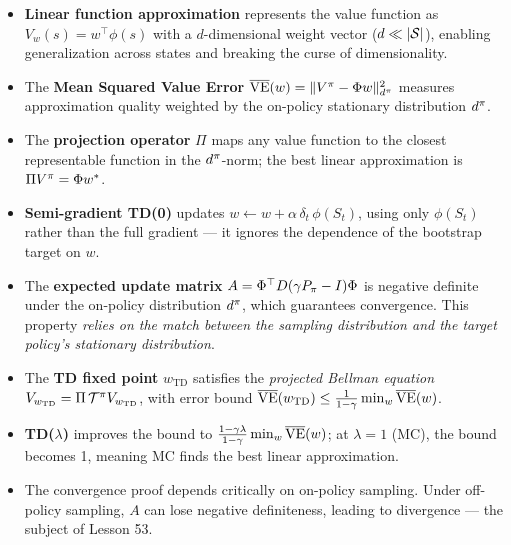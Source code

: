 \documentclass[11pt,a4paper]{article}
\begin{document}
\begin{itemize}
  \item \textbf{Linear function approximation} represents the value
    function as $V_w(s) = w^\top \phi(s)$ with a $d$-dimensional
    weight vector ($d \ll |\mathcal{S}|$), enabling generalization across
    states and breaking the curse of dimensionality.

  \item The \textbf{Mean Squared Value Error}
    $\overline{\mathrm{VE}}(w) = \|V^\pi - \Phi w\|_{d^\pi}^2$
    measures approximation quality weighted by the on-policy stationary
    distribution $d^\pi$.

  \item The \textbf{projection operator} $\Pi$ maps any value function
    to the closest representable function in the $d^\pi$-norm;
    the best linear approximation is $\Pi V^\pi = \Phi w^*$.

  \item \textbf{Semi-gradient TD(0)} updates
    $w \leftarrow w + \alpha\,\delta_t\,\phi(S_t)$, using only
    $\phi(S_t)$ rather than the full gradient --- it ignores the
    dependence of the bootstrap target on $w$.

  \item The \textbf{expected update matrix}
    $A = \Phi^\top D(\gamma P_\pi - I)\Phi$ is negative definite
    under the on-policy distribution $d^\pi$, which guarantees
    convergence. This property \emph{relies on the match between the
    sampling distribution and the target policy's stationary
    distribution}.

  \item The \textbf{TD fixed point} $w_{\mathrm{TD}}$ satisfies the
    \emph{projected Bellman equation}
    $V_{w_\mathrm{TD}} = \Pi\,\mathcal{T}^\pi V_{w_\mathrm{TD}}$,
    with error bound
    $\overline{\mathrm{VE}}(w_{\mathrm{TD}}) \leq
    \frac{1}{1-\gamma}\min_w \overline{\mathrm{VE}}(w)$.

  \item \textbf{TD($\lambda$)} improves the bound to
    $\frac{1-\gamma\lambda}{1-\gamma}\min_w
    \overline{\mathrm{VE}}(w)$; at $\lambda = 1$ (MC), the bound
    becomes 1, meaning MC finds the best linear approximation.

  \item The convergence proof depends critically on on-policy
    sampling. Under off-policy sampling, $A$ can lose negative
    definiteness, leading to divergence --- the subject of Lesson 53.
\end{itemize}
\end{document}
